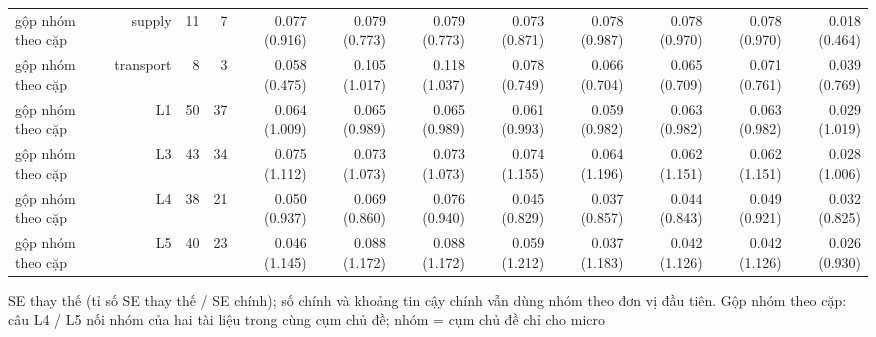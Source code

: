 \begin{table}[ht]
\begin{tabular}{lrrrrrrrrrrr}
gộp nhóm theo cặp & supply & 11 & 7 & 0.077 (0.916) & 0.079 (0.773) & 0.079 (0.773) & 0.073 (0.871) & 0.078 (0.987) & 0.078 (0.970) & 0.078 (0.970) & 0.018 (0.464) \\
gộp nhóm theo cặp & transport & 8 & 3 & 0.058 (0.475) & 0.105 (1.017) & 0.118 (1.037) & 0.078 (0.749) & 0.066 (0.704) & 0.065 (0.709) & 0.071 (0.761) & 0.039 (0.769) \\
gộp nhóm theo cặp & L1 & 50 & 37 & 0.064 (1.009) & 0.065 (0.989) & 0.065 (0.989) & 0.061 (0.993) & 0.059 (0.982) & 0.063 (0.982) & 0.063 (0.982) & 0.029 (1.019) \\
gộp nhóm theo cặp & L3 & 43 & 34 & 0.075 (1.112) & 0.073 (1.073) & 0.073 (1.073) & 0.074 (1.155) & 0.064 (1.196) & 0.062 (1.151) & 0.062 (1.151) & 0.028 (1.006) \\
gộp nhóm theo cặp & L4 & 38 & 21 & 0.050 (0.937) & 0.069 (0.860) & 0.076 (0.940) & 0.045 (0.829) & 0.037 (0.857) & 0.044 (0.843) & 0.049 (0.921) & 0.032 (0.825) \\
gộp nhóm theo cặp & L5 & 40 & 23 & 0.046 (1.145) & 0.088 (1.172) & 0.088 (1.172) & 0.059 (1.212) & 0.037 (1.183) & 0.042 (1.126) & 0.042 (1.126) & 0.026 (0.930) \\
\bottomrule
\end{tabular}
\par\smallskip\footnotesize SE thay thế (tỉ số SE thay thế / SE chính); số chính và khoảng tin cậy chính vẫn dùng nhóm theo đơn vị đầu tiên. Gộp nhóm theo cặp: câu L4 / L5 nối nhóm của hai tài liệu trong cùng cụm chủ đề; nhóm = cụm chủ đề chỉ cho micro
\end{table}

